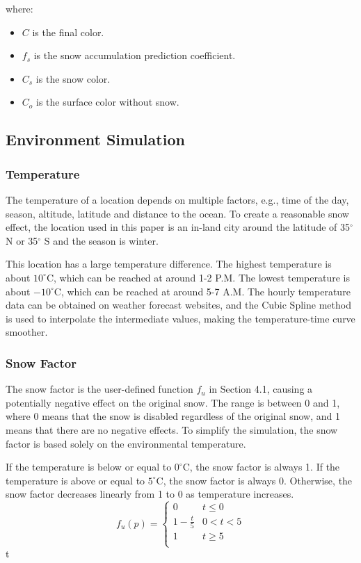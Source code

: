 \documentclass{article}
\begin{document}
where:
\begin{itemize}
  \item \( C \) is the final color.
  \item \( f_{s} \) is the snow accumulation prediction coefficient.
  \item \( C_{s} \) is the snow color.
  \item \( C_{o} \) is the surface color without snow.
\end{itemize}

\subsection {Environment Simulation}

\subsubsection {Temperature}
The temperature of a location depends on multiple factors, e.g., time of the day, season, altitude, 
latitude and distance to the ocean. To create a reasonable snow effect, the location used in this paper 
is an in-land city around the latitude of 35$^{\circ}$ N or 35$^{\circ}$ S and the season is winter.

This location has a large temperature difference. The highest temperature is about 
\(10^\circ\mathrm{C}\), which can be reached at around 1-2 P.M. The lowest temperature is about 
\(-10^\circ\mathrm{C}\), which can be reached at around 5-7 A.M. The hourly temperature data can be
obtained on weather forecast websites, and the Cubic Spline method is used to interpolate the 
intermediate values, making the temperature-time curve smoother.

\subsubsection {Snow Factor}
The snow factor is the user-defined function \( f_{u} \) in Section 4.1, causing a potentially negative 
effect on the original snow. The range is between 0 and 1, where 0 means that the snow is disabled 
regardless of the original snow, and 1 means that there are no negative effects. To simplify the 
simulation, the snow factor is based solely on the environmental temperature. 

If the temperature is below or equal to \(0^\circ\mathrm{C}\), the snow factor is always 1. 
If the temperature is above or equal to \(5^\circ\mathrm{C}\), the snow factor is always 0. 
Otherwise, the snow factor decreases linearly from 1 to 0 as temperature increases.
\[
  f_{u}(p)=
  \left\{
    \begin{array}{ll}
      0 & t\leq 0 \\
      1 - \frac{t}{5} &  0 < t < 5 \\
      1 & t\geq 5 \\
    \end{array} 
  \right. 
\]
 t 
\end{document}
